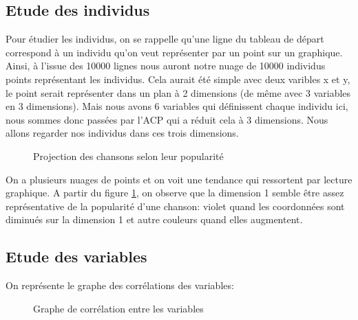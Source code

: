 \documentclass[
  11pt,
  xcolor = usenames,dvipsnames]{article}
\begin{document}
\hypertarget{etude-des-individus}{%
\subsection{Etude des individus}\label{etude-des-individus}}

Pour étudier les individus, on se rappelle qu'une ligne du tableau de départ correspond à un individu qu'on veut représenter par un point sur un graphique.
Ainsi, à l'issue des 10000 lignes nous auront notre nuage de 10000 individus points représentant les individus. Cela aurait été simple avec deux varibles x et y, le point serait représenter dans un plan à 2 dimensions (de même avec 3 variables en 3 dimensions).
Mais nous avons 6 variables qui définissent chaque individu ici, nous sommes donc passées par l'ACP qui a réduit cela à 3 dimensions. Nous
allons regarder nos individus dans ces trois dimensions.

\begin{figure}

{\centering {}

}

\caption{Projection des chansons selon leur popularité}\label{fig:projection-pop-12-13}
\end{figure}

On a plusieurs nuages de points et on voit une tendance qui ressortent par lecture graphique. A partir du figure
\ref{fig:projection-pop-12-13}, on observe que la dimension 1 semble être assez représentative de la popularité d'une chanson:
violet quand les coordonnées sont diminués sur la dimension 1 et autre couleurs quand elles augmentent.

\hypertarget{etude-des-variables}{%
\subsection{Etude des variables}\label{etude-des-variables}}

On représente le graphe des corrélations des variables:

\begin{figure}

{\centering {}

}

\caption{Graphe de corrélation entre les variables}\label{fig:corvar-acp-12}
\end{figure}
\end{document}

